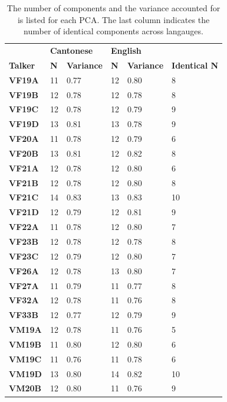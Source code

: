 \begin{table}[htbp]
    \caption{The number of components and the variance accounted for is listed for each PCA. The last column indicates the number of identical components across langauges.}
\label{ch3:tab:componentcount}
\centering
{\small 
    \begin{tabular}{llllll}
    
    \toprule
     & \multicolumn{2}{l}{\textbf{Cantonese}} & \multicolumn{2}{l}{\textbf{English}} &  \\
    \textbf{Talker} & \textbf{N} & \textbf{Variance} & \textbf{N} & \textbf{Variance} & \textbf{Identical N} \\
    \midrule
    \textbf{VF19A} & 11 & 0.77 & 12 & 0.80 & 8 \\
    \textbf{VF19B} & 12 & 0.78 & 12 & 0.78 & 8 \\
    \textbf{VF19C} & 12 & 0.78 & 12 & 0.79 & 9 \\
    \textbf{VF19D} & 13 & 0.81 & 13 & 0.78 & 9 \\
    \textbf{VF20A} & 11 & 0.78 & 12 & 0.79 & 6 \\
    \textbf{VF20B} & 13 & 0.81 & 12 & 0.82 & 8 \\
    \textbf{VF21A} & 12 & 0.78 & 12 & 0.80 & 6 \\
    \textbf{VF21B} & 12 & 0.78 & 12 & 0.80 & 8 \\
    \textbf{VF21C} & 14 & 0.83 & 13 & 0.83 & 10 \\
    \textbf{VF21D} & 12 & 0.79 & 12 & 0.81 & 9 \\
    \textbf{VF22A} & 11 & 0.78 & 12 & 0.80 & 7 \\
    \textbf{VF23B} & 12 & 0.78 & 12 & 0.78 & 8 \\
    \textbf{VF23C} & 12 & 0.79 & 12 & 0.80 & 7 \\
    \textbf{VF26A} & 12 & 0.78 & 13 & 0.80 & 7 \\
    \textbf{VF27A} & 11 & 0.79 & 11 & 0.77 & 8 \\
    \textbf{VF32A} & 12 & 0.78 & 11 & 0.76 & 8 \\
    \textbf{VF33B} & 12 & 0.77 & 12 & 0.79 & 9 \\
    \textbf{VM19A} & 12 & 0.78 & 11 & 0.76 & 5 \\
    \textbf{VM19B} & 11 & 0.80 & 12 & 0.80 & 6 \\
    \textbf{VM19C} & 11 & 0.76 & 11 & 0.78 & 6 \\
    \textbf{VM19D} & 13 & 0.80 & 14 & 0.82 & 10 \\
    \textbf{VM20B} & 12 & 0.80 & 11 & 0.76 & 9 \\

\end{tabular}}
\end{table}
